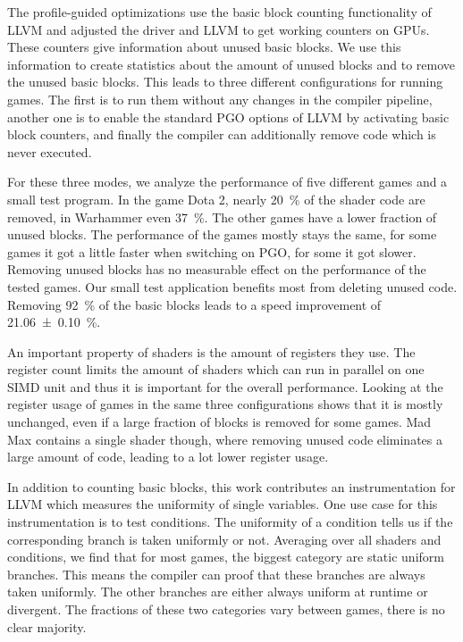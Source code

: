 The profile-guided optimizations use the basic block counting functionality of LLVM and adjusted the driver and LLVM to get working counters on GPUs.
These counters give information about unused basic blocks.
We use this information to create statistics about the amount of unused blocks and to remove the unused basic blocks.
This leads to three different configurations for running games.
The first is to run them without any changes in the compiler pipeline, another one is to enable the standard PGO options of LLVM by activating basic block counters, and finally the compiler can additionally remove code which is never executed.

For these three modes, we analyze the performance of five different games and a small test program.
In the game Dota 2, nearly \SI{20}{\percent} of the shader code are removed, in Warhammer even \SI{37}{\percent}.
The other games have a lower fraction of unused blocks.
The performance of the games mostly stays the same, for some games it got a little faster when switching on PGO, for some it got slower.
Removing unused blocks has no measurable effect on the performance of the tested games.
Our small test application benefits most from deleting unused code.
Removing \SI{92}{\percent} of the basic blocks leads to a speed improvement of \SI{21.06 \pm 0.10}{\percent}.

An important property of shaders is the amount of registers they use.
The register count limits the amount of shaders which can run in parallel on one SIMD unit and thus it is important for the overall performance.
Looking at the register usage of games in the same three configurations shows that it is mostly unchanged, even if a large fraction of blocks is removed for some games.
Mad Max contains a single shader though, where removing unused code eliminates a large amount of code, leading to a lot lower register usage.

In addition to counting basic blocks, this work contributes an instrumentation for LLVM which measures the uniformity of single variables.
One use case for this instrumentation is to test conditions.
The uniformity of a condition tells us if the corresponding branch is taken uniformly or not.
Averaging over all shaders and conditions, we find that for most games, the biggest category are static uniform branches.
This means the compiler can proof that these branches are always taken uniformly.
The other branches are either always uniform at runtime or divergent.
The fractions of these two categories vary between games, there is no clear majority.

